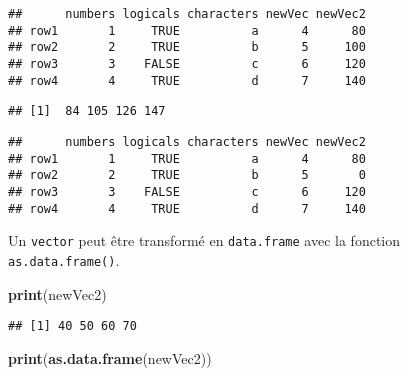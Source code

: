 \documentclass[]{book}
\newenvironment{Shaded}{\begin{snugshade}}{\end{snugshade}}
\newcommand{\KeywordTok}[1]{\textcolor[rgb]{0.13,0.29,0.53}{\textbf{#1}}}
\newcommand{\DecValTok}[1]{\textcolor[rgb]{0.00,0.00,0.81}{#1}}
\newcommand{\StringTok}[1]{\textcolor[rgb]{0.31,0.60,0.02}{#1}}
\newcommand{\OperatorTok}[1]{\textcolor[rgb]{0.81,0.36,0.00}{\textbf{#1}}}
\newcommand{\NormalTok}[1]{#1}
\theoremstyle{definition}
\theoremstyle{definition}
\theoremstyle{definition}
\theoremstyle{remark}
\begin{document}
\begin{verbatim}
##      numbers logicals characters newVec newVec2
## row1       1     TRUE          a      4      80
## row2       2     TRUE          b      5     100
## row3       3    FALSE          c      6     120
## row4       4     TRUE          d      7     140
\end{verbatim}

\begin{Shaded}
\end{Shaded}

\begin{verbatim}
## [1]  84 105 126 147
\end{verbatim}

\begin{Shaded}
\end{Shaded}

\begin{verbatim}
##      numbers logicals characters newVec newVec2
## row1       1     TRUE          a      4      80
## row2       2     TRUE          b      5       0
## row3       3    FALSE          c      6     120
## row4       4     TRUE          d      7     140
\end{verbatim}

Un \texttt{vector} peut être transformé en \texttt{data.frame} avec la
fonction \texttt{as.data.frame()}.

\begin{Shaded}
\begin{Highlighting}[]
\KeywordTok{print}\NormalTok{(newVec2)}
\end{Highlighting}
\end{Shaded}

\begin{verbatim}
## [1] 40 50 60 70
\end{verbatim}

\begin{Shaded}
\begin{Highlighting}[]
\KeywordTok{print}\NormalTok{(}\KeywordTok{as.data.frame}\NormalTok{(newVec2))}
\end{Highlighting}
\end{Shaded}
\end{document}
